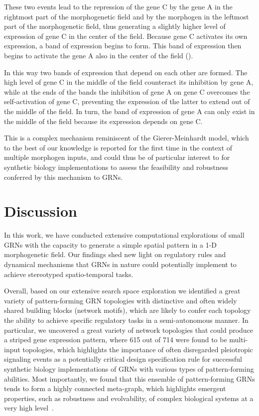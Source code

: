 \documentclass[10pt,letterpaper]{article}
\begin{document}
These two events lead to the repression of the gene C by the gene A in the
rightmost part of the morphogenetic field and by the morphogen in the leftmost
part of the morphogenetic field, thus generating a slightly higher level of
expression of gene C in the center of the field. Because gene C activates its
own expression, a band of expression begins to form. This band of expression
then begins to activate the gene A also in the center of the field
().

In this way two bands of expression that depend on each other are formed. The
high level of gene C in the middle of the field counteract its inhibition by
gene A, while at the ends of the bands the inhibition of gene A on gene C
overcomes the self-activation of gene C, preventing the expression of the
latter to extend out of the middle of the field. In turn, the band of
expression of gene A can only exist in the middle of the field because its
expression depends on gene C.

This is a complex mechanism reminiscent of the Gierer-Meinhardt model, which
to the best of our knowledge is reported for the first time in the context of
multiple morphogen inputs, and could thus be of particular interest to for
synthetic biology implementations to assess the feasibility and robustness
conferred by this mechanism to GRNs.

\section*{Discussion}

In this work, we have conducted extensive computational explorations of small
GRNs with the capacity to generate a simple spatial pattern in a 1-D
morphogenetic field. Our findings shed new light on regulatory rules and
dynamical mechanisms that GRNs in nature could potentially implement to
achieve stereotyped spatio-temporal tasks.

Overall, based on our extensive search space exploration we identified
a great variety of pattern-forming GRN topologies  with distinctive and often
widely shared building blocks (network motifs), which are likely to confer
each topology the ability to achieve specific regulatory tasks in a semi-autonomous
manner. In particular, we uncovered a great variety of network
topologies that could produce a striped gene expression pattern, where 615 out of
714 were found to be multi-input topologies, which highlights the importance of
often disregarded pleiotropic signaling events as a potentially critical design
specification rule for successful synthetic biology implementations of GRNs
with various types of pattern-forming abilities. Most importantly, we found that
this ensemble of pattern-forming GRNs
tends to form a highly connected meta-graph, which highlights emergent
properties, such as robustness and evolvability, of complex biological
systems at a very high level~\cite{kitano2004}.\\
\end{document}
